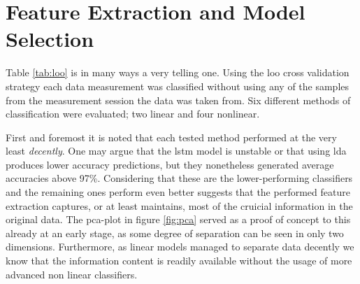 







\section{Feature Extraction and Model Selection}
\label{disc_feat}
Table \ref{tab:loo} is in many ways a very telling one. Using the \gls{loo} cross validation strategy each data measurement was classified without using any of the samples from the measurement session the data was taken from. Six different methods of classification were evaluated; two linear and four nonlinear. 

First and foremost it is noted that each tested method performed at the very least \emph{decently}. One may argue that the \gls{lstm} model is unstable or that using \gls{lda} produces lower accuracy predictions, but they nonetheless generated average accuracies above 97\%. Considering that these are the lower-performing classifiers and the remaining ones perform even better suggests that the performed feature extraction captures, or at least maintains, most of the cruicial information in the original data. The \gls{pca}-plot in figure \ref{fig:pca} served as a proof of concept to this already at an early stage, as some degree of separation can be seen in only two dimensions. Furthermore, as linear models managed to separate data decently we know that the information content is readily available without the usage of more advanced non linear classifiers.  

